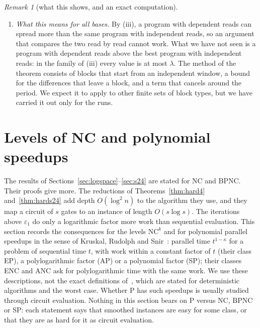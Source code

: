 \documentclass[11pt]{amsart}
\theoremstyle{definition}
\theoremstyle{remark}
\newtheorem{remark}[theorem]{Remark}
\newcommand{\eps}{\varepsilon}
\begin{document}
\begin{remark}[what this shows, and an exact computation]
\begin{enumerate}[label=(\roman*),leftmargin=2.4em]
same design with independent reads. The gain is $0.0017$ here, the largest we found is of this
size, and it is below the resolution of the simulations of Remark~\ref{rem:dependent}. The
order matters: with the two reads of the first window next to each other the same three reads
give $G_2=0.9519$, or $0.9369$ if the target comes first, against $0.9628$; and the program of
period $2$ that reads position $1$ of a window and then the target at position $0$ has
$G_2=0.9397$, against $0.9582$ for independent reads. These are floating-point values in the
ideal model, not proved statements; the referee confirmed the gain with a second exact program
and with a simulation of single flips ($0.0018\pm0.0001$).
\item \emph{What this means for all bases.} By (iii), a program with dependent reads can
spread more than the same program with independent reads, so an argument that compares the two
read by read cannot work. What we have not seen is a program with dependent reads above the
best program with independent reads: in the family of (iii) every value is at most $\lambda$.
The method of the theorem consists of blocks that start from an independent window, a bound for
the differences that leave a block, and a term that cancels around the period. We expect it to
apply to other finite sets of block types, but we have carried it out only for the runs.
\end{enumerate}
\end{remark}

\section{Levels of NC and polynomial speedups}\label{sec:levels}

The results of Sections~\ref{sec:logspace}--\ref{sec:s24} are stated for NC and BPNC. Their
proofs give more. The reductions of Theorems~\ref{thm:hard4} and~\ref{thm:hards24} add depth
$O(\log^2n)$ to the algorithm they use, and they map a circuit of $s$ gates to an instance of
length $O(s\log s)$. The
iterations above $\eps_1$ do only a logarithmic factor more work than sequential evaluation. This
section records the consequences for the levels $\mathrm{NC}^k$ and for polynomial parallel
speedups in the sense of Kruskal, Rudolph and Snir~\cite{krs}: parallel time $t^{1-\kappa}$ for a
problem of sequential time $t$, with work within a constant factor of $t$ (their class EP), a
polylogarithmic factor (AP) or a polynomial factor (SP); their classes ENC and ANC ask for
polylogarithmic time with the same work. We use these descriptions, not the exact definitions
of~\cite{krs}, which are stated for deterministic algorithms and the worst case. Whether P
has such speedups is usually studied through circuit evaluation. Nothing in
this section bears on $\mathrm P$ versus $\mathrm{NC}$, $\mathrm{BPNC}$ or SP: each statement says
that smoothed instances are easy for some class, or that they are as hard for it as circuit
evaluation.
\end{document}

